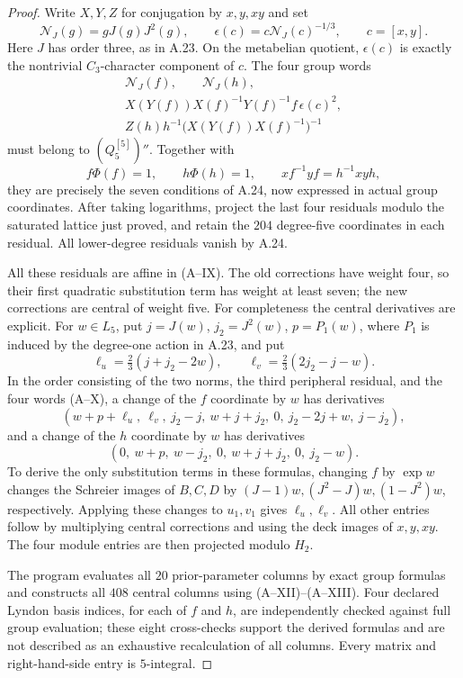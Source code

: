 \begin{proof}
Write $X,Y,Z$ for conjugation by $x,y,xy$ and set
\[
 \mathcal N_J(g)=gJ(g)J^2(g),\qquad
 \epsilon(c)=c\mathcal N_J(c)^{-1/3},\qquad c=[x,y].
\]
Here $J$ has order three, as in A.23. On the metabelian
quotient, $\epsilon(c)$ is exactly the nontrivial
$C_3$-character component of $c$.
The four group words
\[
\begin{gathered}
 \mathcal N_J(f),\qquad \mathcal N_J(h),\\
 X(Y(f))X(f)^{-1}Y(f)^{-1}f\,\epsilon(c)^2,\\
 Z(h)h^{-1}\bigl(X(Y(f))X(f)^{-1}\bigr)^{-1}
\end{gathered}                                                   \tag{A--X}
\]
must belong to $(Q_5^{[5]})''$. Together with
\[
 f\Phi(f)=1,\qquad h\Phi(h)=1,\qquad
          xf^{-1}yf=h^{-1}xyh,                                  \tag{A--XI}
\]
they are precisely the seven conditions of A.24, now
expressed in actual group coordinates.
After taking logarithms, project the last four residuals
modulo the saturated lattice just proved, and retain
the $204$ degree-five coordinates in each residual.
All lower-degree residuals vanish by A.24.

All these residuals are affine in (A--IX).
The old corrections have weight four, so their first
quadratic substitution term has weight at least seven;
the new corrections are central of weight five.
For completeness the central derivatives are explicit.
For $w\in L_5$, put $j=J(w)$, $j_2=J^2(w)$, $p=P_1(w)$,
where $P_1$ is induced by the degree-one action in A.23,
and put
\[
 \ell_u=\tfrac23(j+j_2-2w),\qquad
 \ell_v=\tfrac23(2j_2-j-w).
\]
In the order consisting of the two norms, the third
peripheral residual, and the four words (A--X), a change
of the $f$ coordinate by $w$ has derivatives
\[
 (w+p+\ell_u,\ \ell_v,\ j_2-j,\
   w+j+j_2,\ 0,\ j_2-2j+w,\ j-j_2),                           \tag{A--XII}
\]
and a change of the $h$ coordinate by $w$ has derivatives
\[
 (0,\ w+p,\ w-j_2,\ 0,\ w+j+j_2,\ 0,\ j_2-w).              \tag{A--XIII}
\]
To derive the only substitution terms in these formulas,
changing $f$ by $\exp w$ changes the Schreier images of
$B,C,D$ by $(J-1)w,(J^2-J)w,(1-J^2)w$, respectively.
Applying these changes to $u_1,v_1$ gives
$\ell_u,\ell_v$. All other entries follow by multiplying
central corrections and using the deck images of $x,y,xy$.
The four module entries are then projected modulo $H_2$.

The program evaluates all $20$ prior-parameter columns
by exact group formulas and constructs all $408$ central
columns using (A--XII)--(A--XIII). Four declared Lyndon
basis indices, for each of $f$ and $h$, are independently
checked against full group evaluation; these eight
cross-checks support the derived formulas and are not
described as an exhaustive recalculation of all columns.
Every matrix and right-hand-side entry is $5$-integral.


\end{proof}
